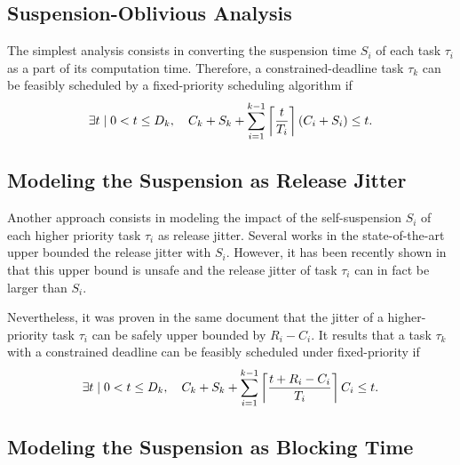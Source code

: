 \subsection{Suspension-Oblivious Analysis}
\label{sec:suspension-oblivious} 
The simplest analysis consists in converting the suspension time $S_i$ of each %
task $\tau_i$ as a part of its computation
time. Therefore, a constrained-deadline task $\tau_k$ can be feasibly
scheduled by a fixed-priority scheduling algorithm if
\begin{equation}
\label{eq:TDA-SO}
\exists t \mid 0 < t \leq D_k, \quad C_k + S_k + \sum_{i=1}^{k-1}\ceiling{\frac{t}{T_i}} (C_i+S_i) \leq t.
\end{equation}

\subsection{Modeling the Suspension as Release Jitter}
\label{sec:jitter}

Another approach consists in modeling the impact of the self-suspension $S_i$ of each higher priority task $\tau_i$ as release jitter. Several works in the state-of-the-art \cite{ECRTS-AudsleyB04,RTAS-AudsleyB04,RTCSA-KimCPKH95,MingLiRTCSA1994} upper bounded the release jitter with $S_i$. However, it has been recently shown in~\cite{BletsasReport2015} that this upper bound is unsafe and  the release jitter of task $\tau_i$ can in fact be larger than $S_i$. 

Nevertheless, it was proven in the same document \cite{BletsasReport2015} that the jitter of a higher-priority task $\tau_i$ can be safely upper bounded by $R_i-C_i$. It results that a task
$\tau_k$ with a constrained deadline can be feasibly scheduled under fixed-priority if
\begin{equation}
\label{eq:TDA-jitter}
\exists t \mid 0 < t \leq D_k, \quad C_k + S_k + \sum_{i=1}^{k-1}\ceiling{\frac{t+R_i-C_i}{T_i}} C_i \leq t.
\end{equation}

\subsection{Modeling the Suspension as Blocking Time}
\label{sec:suspension-blocking}

